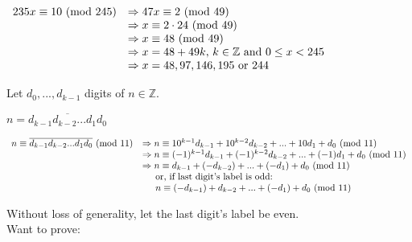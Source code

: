 \documentclass[a4paper, 11pt]{article}
\begin{document}
\begin{myEnumerate}
\begin{myEnumerate}
        \( \\
        \begin{array}{ll}
        	235x \equiv 10 $ $ ($mod $ 245) & \Rightarrow 47x \equiv 2 $ $ ($mod $ 49) \\
            								& \Rightarrow x \equiv 2 \cdot 24 $ $ ($mod $ 49) \\
                                            & \Rightarrow x \equiv 48 $ $ ($mod $ 49) \\
                                            & \Rightarrow x = 48 + 49k, $ $ k \in \mathbb{Z} $ and $ 0 \leq x < 245 \\
                                            & \Rightarrow x = 48, 97, 146, 195 $ or $ 244
        \end{array} \\ \)
        
    \end{myEnumerate}
	
    \item
    Let $d_{0},...,d_{k - 1}$ digits of $n \in \mathbb{Z}$. \\
    
    \centerline{$n = \overline{d_{k - 1}d_{k - 2}...d_{1}d_{0}}$}
    
    \( \\
    \begin{array}{ll}
     	n \equiv \overline{d_{k - 1}d_{k - 2}...d_{1}d_{0}} $ $ ($mod $ 11) & \Rightarrow n \equiv 10^{k - 1}d_{k - 1} + 10^{k - 2}d_{k - 2} + ... + 10d_{1} + d_{0} $ $ ($mod $ 11) \\
																			& \Rightarrow n \equiv (-1)^{k - 1}d_{k - 1} + (-1)^{k - 2}d_{k - 2} + ... + (-1)d_{1} + d_{0} $ $ ($mod $ 11) \\
																			& \Rightarrow n \equiv d_{k - 1} + (-d_{k - 2}) + ... + (-d_{1}) + d_{0} $ $ ($mod $ 11) \\
                                        									& \hspace{5mm} $or, if last digit's label is odd:$ \\
																			& \hspace{5mm} n \equiv (-d_{k - 1}) + d_{k - 2} + ... + (-d_{1}) + d_{0} $ $ ($mod $ 11)
    \end{array} \\ \)
    
    Without loss of generality, let the last digit's label be even. \\
    Want to prove: \\
    

\end{myEnumerate}
\end{document}
